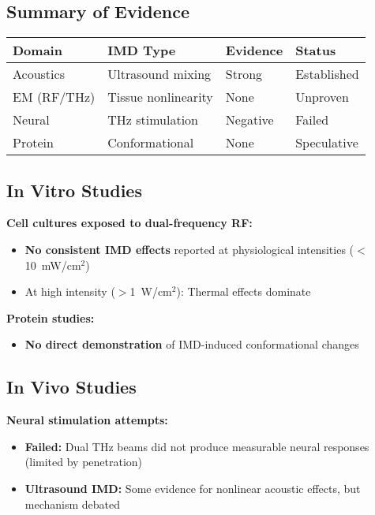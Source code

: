 \subsection{Summary of Evidence}

\begin{center}
\begin{tabular}{@{}llll@{}}
\toprule
\textbf{Domain} & \textbf{IMD Type} & \textbf{Evidence} & \textbf{Status} \\
\midrule
Acoustics & Ultrasound mixing & Strong & Established \\
EM (RF/THz) & Tissue nonlinearity & None & Unproven \\
Neural & THz stimulation & Negative & Failed \\
Protein & Conformational & None & Speculative \\
\bottomrule
\end{tabular}
\end{center}

\subsection{In Vitro Studies}

\textbf{Cell cultures exposed to dual-frequency RF:}
\begin{itemize}
\item \textbf{No consistent IMD effects} reported at physiological intensities ($<$10~mW/cm$^2$)
\item At high intensity ($>$1~W/cm$^2$): Thermal effects dominate
\end{itemize}

\textbf{Protein studies:}
\begin{itemize}
\item \textbf{No direct demonstration} of IMD-induced conformational changes
\end{itemize}

\subsection{In Vivo Studies}

\textbf{Neural stimulation attempts:}
\begin{itemize}
\item \textbf{Failed:} Dual THz beams did not produce measurable neural responses (limited by penetration)
\item \textbf{Ultrasound IMD:} Some evidence for nonlinear acoustic effects, but mechanism debated
\end{itemize}


